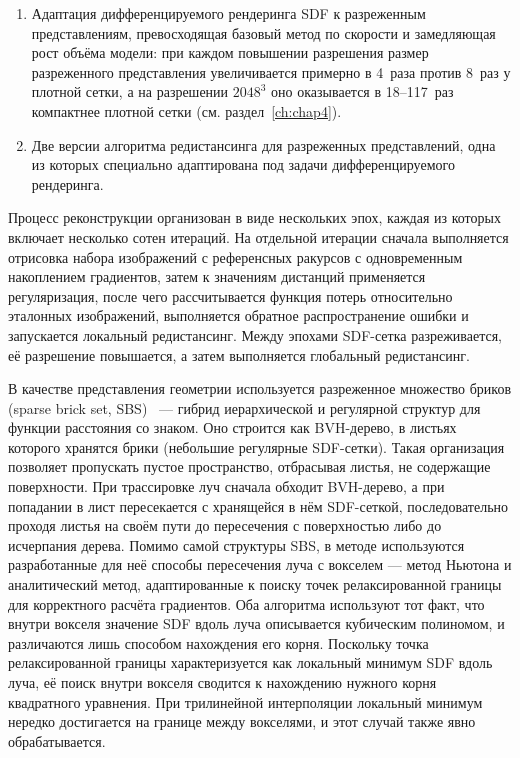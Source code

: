 \begin{enumerate}
    \item Адаптация дифференцируемого рендеринга SDF к разреженным
          представлениям, превосходящая базовый метод по скорости и замедляющая
          рост объёма модели: при каждом повышении разрешения размер
          разреженного представления увеличивается примерно в 4~раза против
          8~раз у плотной сетки, а на разрешении $2048^3$ оно оказывается в
          18--117~раз компактнее плотной сетки (см. раздел~\ref{ch:chap4}).
    \item Две версии алгоритма редистансинга для разреженных представлений,
          одна из которых специально адаптирована под задачи дифференцируемого
          рендеринга.
\end{enumerate}

Процесс реконструкции организован в виде нескольких эпох, каждая из которых
включает несколько сотен итераций. На отдельной итерации сначала выполняется
отрисовка набора изображений с референсных ракурсов с одновременным накоплением
градиентов, затем к значениям дистанций применяется регуляризация, после чего
рассчитывается функция потерь относительно эталонных изображений, выполняется
обратное распространение ошибки и запускается локальный редистансинг. Между
эпохами SDF-сетка разреживается, её разрешение повышается, а затем выполняется
глобальный редистансинг.

В качестве представления геометрии используется разреженное множество бриков
(sparse brick set, SBS)~\cite{HanssonSoderlund} --- гибрид иерархической и
регулярной структур для функции расстояния со знаком. Оно строится как
BVH-дерево, в листьях которого хранятся брики (небольшие регулярные SDF-сетки).
Такая организация позволяет пропускать пустое пространство, отбрасывая листья,
не содержащие поверхности. При трассировке луч сначала обходит BVH-дерево, а при
попадании в лист пересекается с хранящейся в нём SDF-сеткой, последовательно
проходя листья на своём пути до пересечения с поверхностью либо до исчерпания
дерева. Помимо самой структуры SBS, в методе используются разработанные для неё
способы пересечения луча с вокселем --- метод Ньютона и аналитический метод,
адаптированные к поиску точек релаксированной границы для корректного расчёта
градиентов. Оба алгоритма используют тот факт, что внутри вокселя значение SDF
вдоль луча описывается кубическим полиномом, и различаются лишь способом
нахождения его корня. Поскольку точка релаксированной границы характеризуется
как локальный минимум SDF вдоль луча, её поиск внутри вокселя сводится к
нахождению нужного корня квадратного уравнения. При трилинейной интерполяции
локальный минимум нередко достигается на границе между вокселями, и этот случай
также явно обрабатывается.

